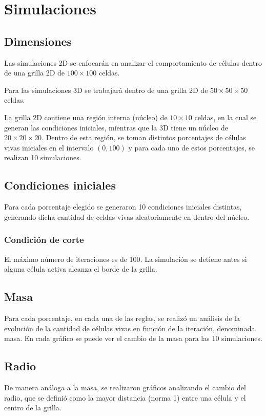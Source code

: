 \section{Simulaciones}
\label{sec:simulaciones}

\subsection{Dimensiones}
\label{subsec:acdim}
Las simulaciones 2D se enfocarán en analizar el comportamiento de células dentro de una grilla 2D de $100 \times 100$ celdas.

Para las simulaciones 3D se trabajará dentro de una grilla 2D de $50 \times 50 \times 50$ celdas.

La grilla 2D contiene una región interna (núcleo) de $10 \times 10$ celdas, en la cual se generan las condiciones iniciales, mientras que la 3D tiene un núcleo de $20 \times 20 \times 20$.
Dentro de esta región, se toman distintos porcentajes de células vivas iniciales en el intervalo $(0, 100)$ y para cada uno de estos porcentajes, se realizan 10 simulaciones.

\subsection{Condiciones iniciales}
\label{subsec:acini}
Para cada porcentaje elegido se generaron 10 condiciones iniciales distintas, generando dicha cantidad de celdas vivas aleatoriamente en dentro del núcleo.

\subsubsection{Condición de corte}
\label{subsubsec:ac2corte}
El máximo número de iteraciones es de 100.
La simulación se detiene antes si alguna célula activa alcanza el borde de la grilla.

\subsection{Masa}
Para cada porcentaje, en cada una de las reglas, se realizó un análisis de la evolución de la cantidad de células vivas en función de la iteración, denominada masa.
En cada gráfico se puede ver el cambio de la masa para las 10 simulaciones.

\subsection{Radio}
De manera análoga a la masa, se realizaron gráficos analizando el cambio del radio, que se definió como la mayor distancia (norma 1) entre una célula y el centro de la grilla.

